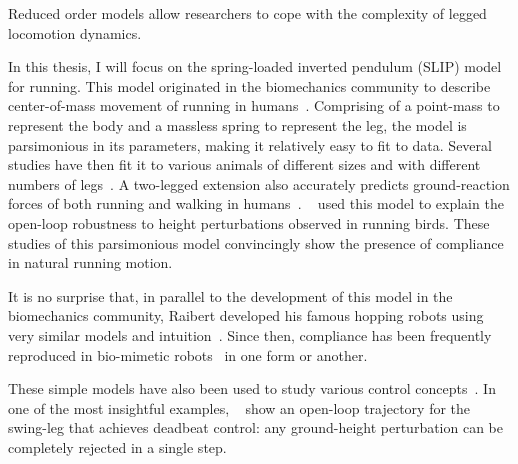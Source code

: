 Reduced order models allow researchers to cope with the complexity of legged locomotion dynamics. \par
In this thesis, I will focus on the spring-loaded inverted pendulum (SLIP) model for running. This model originated in the biomechanics community to describe center-of-mass movement of running in humans~\cite{blickhan1989spring}. Comprising of a point-mass to represent the body and a massless spring to represent the leg, the model is parsimonious in its parameters, making it relatively easy to fit to data.
Several studies have then fit it to various animals of different sizes and with different numbers of legs~\cite{blickhan1993similarity,daley2006running,jindrich2002dynamic}. A two-legged extension also accurately predicts ground-reaction forces of both running and walking in humans~\cite{geyer2006compliant}. ~\textcite{daley2006running} used this model to explain the open-loop robustness to height perturbations observed in running birds.
These studies of this parsimonious model convincingly show the presence of compliance in natural running motion. \par
It is no surprise that, in parallel to the development of this model in the biomechanics community, Raibert developed his famous hopping robots using very similar models and intuition~\cite[see Figure 2.5]{raibert1986legged}.
Since then, compliance has been frequently reproduced in bio-mimetic robots~\cite{sprowitz2013cheetah,buchli2006resonance,hubicki2016atrias,hutter2016anymal,kenneally2016design,ramos2018facilitating} in one form or another. \par
These simple models have also been used to study various control concepts~\cite{piovan2013two,cnops2015basin,piovan2015reachability}. In one of the most insightful examples, ~\textcite{wu20133} show an open-loop trajectory for the swing-leg that achieves deadbeat control: any ground-height perturbation can be completely rejected in a single step. \par 
